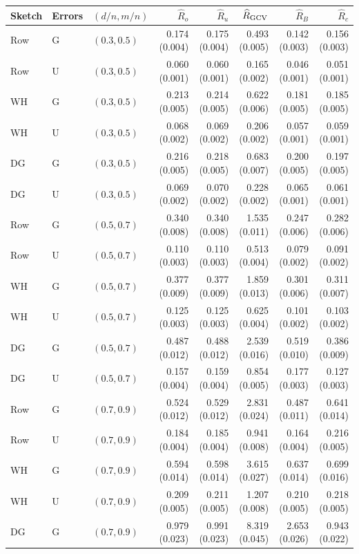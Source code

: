 \begin{tabular}{@{}lllrrrrr@{}}
\toprule
Sketch & Errors & $(d/n,m/n)$ & $\widehat R_o$ & $\widehat R_u$ & $\widehat R_{\rm GCV}$ & $\widehat R_B$ & $\widehat R_c$ \\
\midrule
Row & G & $(0.3,0.5)$ & 0.174 (0.004) & 0.175 (0.004) & 0.493 (0.005) & 0.142 (0.003) & 0.156 (0.003) \\
Row & U & $(0.3,0.5)$ & 0.060 (0.001) & 0.060 (0.001) & 0.165 (0.002) & 0.046 (0.001) & 0.051 (0.001) \\
WH & G & $(0.3,0.5)$ & 0.213 (0.005) & 0.214 (0.005) & 0.622 (0.006) & 0.181 (0.005) & 0.185 (0.005) \\
WH & U & $(0.3,0.5)$ & 0.068 (0.002) & 0.069 (0.002) & 0.206 (0.002) & 0.057 (0.001) & 0.059 (0.001) \\
DG & G & $(0.3,0.5)$ & 0.216 (0.005) & 0.218 (0.005) & 0.683 (0.007) & 0.200 (0.005) & 0.197 (0.005) \\
DG & U & $(0.3,0.5)$ & 0.069 (0.002) & 0.070 (0.002) & 0.228 (0.002) & 0.065 (0.001) & 0.061 (0.001) \\
\midrule
Row & G & $(0.5,0.7)$ & 0.340 (0.008) & 0.340 (0.008) & 1.535 (0.011) & 0.247 (0.006) & 0.282 (0.006) \\
Row & U & $(0.5,0.7)$ & 0.110 (0.003) & 0.110 (0.003) & 0.513 (0.004) & 0.079 (0.002) & 0.091 (0.002) \\
WH & G & $(0.5,0.7)$ & 0.377 (0.009) & 0.377 (0.009) & 1.859 (0.013) & 0.301 (0.006) & 0.311 (0.007) \\
WH & U & $(0.5,0.7)$ & 0.125 (0.003) & 0.125 (0.003) & 0.625 (0.004) & 0.101 (0.002) & 0.103 (0.002) \\
DG & G & $(0.5,0.7)$ & 0.487 (0.012) & 0.488 (0.012) & 2.539 (0.016) & 0.519 (0.010) & 0.386 (0.009) \\
DG & U & $(0.5,0.7)$ & 0.157 (0.004) & 0.159 (0.004) & 0.854 (0.005) & 0.177 (0.003) & 0.127 (0.003) \\
\midrule
Row & G & $(0.7,0.9)$ & 0.524 (0.012) & 0.529 (0.012) & 2.831 (0.024) & 0.487 (0.011) & 0.641 (0.014) \\
Row & U & $(0.7,0.9)$ & 0.184 (0.004) & 0.185 (0.004) & 0.941 (0.008) & 0.164 (0.004) & 0.216 (0.005) \\
WH & G & $(0.7,0.9)$ & 0.594 (0.014) & 0.598 (0.014) & 3.615 (0.027) & 0.637 (0.014) & 0.699 (0.016) \\
WH & U & $(0.7,0.9)$ & 0.209 (0.005) & 0.211 (0.005) & 1.207 (0.008) & 0.210 (0.005) & 0.218 (0.005) \\
DG & G & $(0.7,0.9)$ & 0.979 (0.023) & 0.991 (0.023) & 8.319 (0.045) & 2.653 (0.026) & 0.943 (0.022) \\

\end{tabular}
